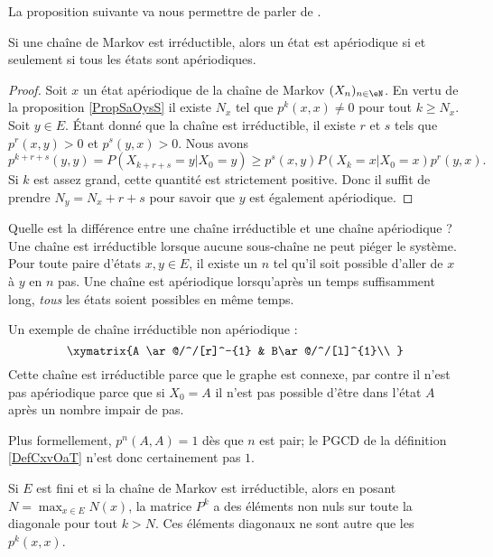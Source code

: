 La proposition suivante va nous permettre de parler de 
.
\begin{proposition}
    Si une chaîne de Markov est irréductible, alors un état est apériodique si et seulement si tous les états sont apériodiques.
\end{proposition}

\begin{proof}
    Soit \( x\) un état apériodique de la chaîne de Markov \( (X_n)_{n\in \eN}\). En vertu de la proposition \ref{PropSaOysS} il existe \( N_x\) tel que \( p^k(x,x)\neq 0\) pour tout \( k\geq N_x\). Soit \( y\in E\). Étant donné que la chaîne est irréductible, il existe \( r\) et \( s\) tels que\( p^r(x,y)>0\) et \( p^s(y,x)>0\). Nous avons
    \begin{equation}
        p^{k+r+s}(y,y)=P(X_{k+r+s}=y|X_0=y)\geq p^s(x,y)P(X_k=x|X_0=x)p^r(y,x).
    \end{equation}
    Si \( k\) est assez grand, cette quantité est strictement positive. Donc il suffit de prendre \( N_y=N_x+r+s\) pour savoir que \( y\) est également apériodique.
\end{proof}

\begin{example}
Quelle est la différence entre une chaîne irréductible et une chaîne apériodique ? Une chaîne est irréductible lorsque aucune sous-chaîne ne peut piéger le système. Pour toute paire d'états \( x,y\in E\), il existe un \( n\) tel qu'il soit possible d'aller de \( x\) à \( y\) en \( n\) pas. Une chaîne est apériodique lorsqu'après un temps suffisamment long, \emph{tous} les états soient possibles en même temps.

Un exemple de chaîne irréductible non apériodique :
\begin{equation}
\xymatrix{%
    A \ar@/^/[r]^-{1}    &   B\ar@/^/[l]^{1}\\
   }
\end{equation}
Cette chaîne est irréductible parce que le graphe est connexe, par contre il n'est pas apériodique parce que si \( X_0=A\) il n'est pas possible d'être dans l'état \( A\) après un nombre impair de pas.

Plus formellement, \( p^n(A,A)=1\) dès que \( n\) est pair; le PGCD de la définition \ref{DefCxvOaT} n'est donc certainement pas \( 1\).
\end{example}

Si \( E\) est fini et si la chaîne de Markov est irréductible, alors en posant \( N=\max_{x\in E}N(x)\), la matrice \( P^k\) a des éléments non nuls sur toute la diagonale pour tout \( k>N\). Ces éléments diagonaux ne sont autre que les \( p^k(x,x)\).

